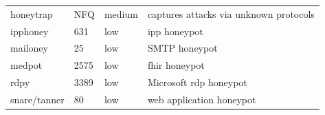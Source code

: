 \begin{table}
\begin{tabularx}{\linewidth}{l|XlX}
        honeytrap \cite{honeytrap2021}           & NFQ                                                                                                         & medium                     & captures attacks via unknown protocols                                               \\
        ipphoney \cite{ipphoney2021}             & 631                                                                                                         & low                        & \ac{ipp} honeypot                                                                    \\
        mailoney                                 & 25                                                                                                          & low                        & SMTP honeypot                                                                        \\
        medpot \cite{medpot2021}                 & 2575                                                                                                        & low                        & \ac{fhir} honeypot                                                                   \\
        rdpy \cite{rdpy2021}                     & 3389                                                                                                        & low                        & Microsoft \ac{rdp} honeypot                                                          \\
        snare/tanner \cite{snare2021}            & 80                                                                                                          & low                        & web application honeypot                                                             \\

\end{tabularx}
\end{table}

